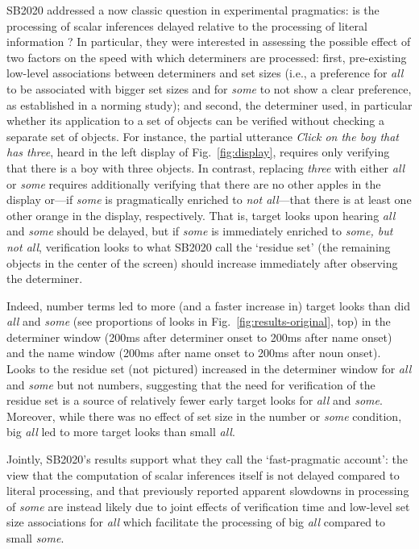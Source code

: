 \documentclass[10pt,letterpaper]{article}
\newcommand{\figref}[1]{Fig.~\ref{#1}}
\begin{document}
SB2020 addressed a now classic question in experimental pragmatics: is the processing of scalar inferences delayed relative to the processing of literal information \cite{bott2004, Breheny2006, huang2009, grodner2010, DegenT2016, Tomlinson2013}? In particular, they were interested in assessing the possible effect of two factors on the speed with which determiners are processed: first, pre-existing low-level associations between determiners and set sizes (i.e., a preference for \emph{all} to be associated with bigger set sizes and for \emph{some} to not show a clear preference, as established in a norming study); and second, the determiner used, in particular whether its application to a set of objects can be verified without checking a separate set of objects. For instance, the partial utterance \emph{Click on the boy that has three}, heard in the left display of \figref{fig:display}, requires only verifying that there is a boy with three objects. In contrast, replacing \emph{three} with either \emph{all} or \emph{some} requires additionally verifying that there are no other apples in the display or---if \emph{some} is pragmatically enriched to \emph{not all}---that there is at least one other orange in the display, respectively. That is, target looks upon hearing \emph{all} and \emph{some} should be delayed, but if \emph{some} is immediately enriched to \emph{some, but not all}, verification looks to what SB2020 call the `residue set' (the remaining objects in the center of the screen) should increase immediately after observing the determiner. 



Indeed, number terms led to more (and a faster increase in) target looks than did \emph{all} and \emph{some} (see proportions of looks in  \figref{fig:results-original}, top) in the determiner window (200ms after determiner onset to 200ms after name onset) and the name window (200ms after name onset to 200ms after noun onset). Looks to the residue set (not pictured) increased in the determiner window for \emph{all} and \emph{some} but not numbers,  suggesting that the need for verification of the residue set is a source of relatively fewer early target looks for \emph{all} and \emph{some}. Moreover, while there was no effect of set size in the number or \emph{some} condition, big \emph{all} led to more target looks than small \emph{all}. 

Jointly, SB2020's results support what they call the `fast-pragmatic account': the view that the computation of scalar inferences itself is not delayed compared to literal processing, and that previously reported apparent slowdowns in processing of \emph{some} are instead likely due to joint effects of verification time and low-level set size associations for \emph{all} which facilitate the processing of big \emph{all} compared to small \emph{some}. 
\end{document}

